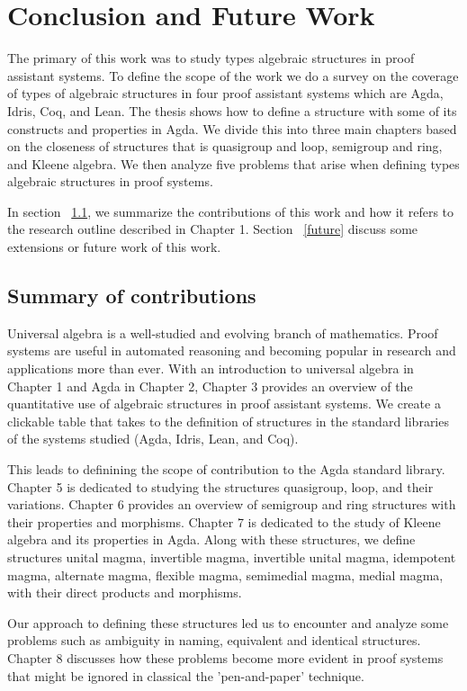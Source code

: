 \chapter{Conclusion and Future Work}
The primary of this work was to study types algebraic structures in proof
assistant systems. To define the scope of the work we do a survey on the
coverage of types of algebraic structures in four proof assistant systems which
are Agda, Idris, Coq, and Lean. The thesis shows how to define a structure with
some of its constructs and properties in Agda. We divide this into three main
chapters based on the closeness of structures that is quasigroup and loop,
semigroup and ring, and Kleene algebra. We then analyze five problems that arise
when defining types algebraic structures in proof systems.

In section ~\ref{contribution}, we summarize the contributions of this work and
how it refers to the research outline described in Chapter 1. Section
~\ref{future} discuss some extensions or future work of this work. 

\section{Summary of contributions}
\label{contribution}
Universal algebra is a well-studied and evolving branch of mathematics. Proof
systems are useful in automated reasoning and becoming popular in research and
applications more than ever. With an introduction to universal algebra in
Chapter 1 and Agda in Chapter 2, Chapter 3 provides an overview of the
quantitative use of algebraic structures in proof assistant systems. We create a
clickable table that takes to the definition of structures in the standard
libraries of the systems studied (Agda, Idris, Lean, and Coq).

This leads to definining the scope of contribution to the Agda standard library.
Chapter 5 is dedicated to studying the structures quasigroup, loop, and their
variations. Chapter 6 provides an overview of semigroup and ring structures with
their properties and morphisms. Chapter 7 is dedicated to the study of Kleene
algebra and its properties in Agda. Along with these structures, we define
structures unital magma, invertible magma, invertible unital magma, idempotent
magma, alternate magma, flexible magma, semimedial magma, medial magma, with
their direct products and morphisms.

Our approach to defining these structures led us to encounter and analyze some
problems such as ambiguity in naming, equivalent and identical structures.
Chapter 8 discusses how these problems become more evident in proof systems that
might be ignored in classical the 'pen-and-paper' technique.

